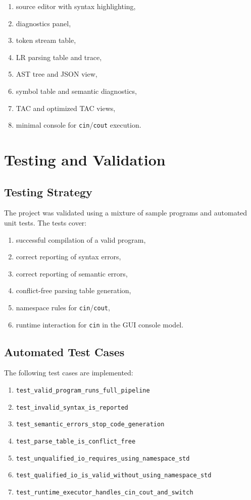 \documentclass[12pt,a4paper]{article}
\begin{document}
\begin{enumerate}
    \item source editor with syntax highlighting,
    \item diagnostics panel,
    \item token stream table,
    \item LR parsing table and trace,
    \item AST tree and JSON view,
    \item symbol table and semantic diagnostics,
    \item TAC and optimized TAC views,
    \item minimal console for \texttt{cin}/\texttt{cout} execution.
\end{enumerate}

\section{Testing and Validation}
\subsection{Testing Strategy}
The project was validated using a mixture of sample programs and automated unit tests. The tests cover:

\begin{enumerate}
    \item successful compilation of a valid program,
    \item correct reporting of syntax errors,
    \item correct reporting of semantic errors,
    \item conflict-free parsing table generation,
    \item namespace rules for \texttt{cin}/\texttt{cout},
    \item runtime interaction for \texttt{cin} in the GUI console model.
\end{enumerate}

\subsection{Automated Test Cases}
The following test cases are implemented:

\begin{enumerate}
    \item \texttt{test\_valid\_program\_runs\_full\_pipeline}
    \item \texttt{test\_invalid\_syntax\_is\_reported}
    \item \texttt{test\_semantic\_errors\_stop\_code\_generation}
    \item \texttt{test\_parse\_table\_is\_conflict\_free}
    \item \texttt{test\_unqualified\_io\_requires\_using\_namespace\_std}
    \item \texttt{test\_qualified\_io\_is\_valid\_without\_using\_namespace\_std}
    \item \texttt{test\_runtime\_executor\_handles\_cin\_cout\_and\_switch}
\end{enumerate}
\end{document}
